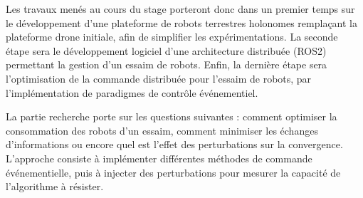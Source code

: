 Les travaux menés au cours du stage porteront donc dans un premier temps sur le développement d'une plateforme de robots terrestres holonomes remplaçant la plateforme drone initiale, afin de simplifier les expérimentations. La seconde étape sera le développement logiciel d'une architecture distribuée (ROS2) permettant la gestion d'un essaim de robots. Enfin, la dernière étape sera l'optimisation de la commande distribuée pour l'essaim de robots, par l'implémentation de paradigmes de contrôle événementiel.


La partie recherche porte sur les questions suivantes : comment optimiser la consommation des robots d'un essaim, comment minimiser les échanges d'informations ou encore quel est l'effet des perturbations sur la convergence. L'approche consiste à implémenter différentes méthodes de commande événementielle, puis à injecter des perturbations  pour mesurer la capacité de l'algorithme à résister. 

